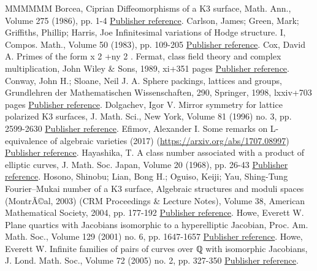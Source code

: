 \documentclass[11pt]{article}
\theoremstyle{definition}
\numberwithin{equation}{section}
\numberwithin{figure}{section}
\numberwithin{table}{section}
\begin{document}
\begin{thebibliography}{MMMMMM}
 Borcea, Ciprian Diffeomorphisms of a K3 surface, Math. Ann., Volume 275 (1986), pp. 1-4 \href{https://ahl.centre-mersenne.org/item/AHL_2018__1__227_0/#Borcea}{Publisher reference}.
 Carlson, James; Green, Mark; Griffiths, Phillip; Harris, Joe Infinitesimal variations of Hodge structure. I, Compos. Math., Volume 50 (1983), pp. 109-205 \href{https://ahl.centre-mersenne.org/item/AHL_2018__1__227_0/#CGGH}{Publisher reference}.
 Cox, David A. Primes of the form x 2 +ny 2 . Fermat, class field theory and complex multiplication, John Wiley \& Sons, 1989, xi+351 pages \href{https://ahl.centre-mersenne.org/item/AHL_2018__1__227_0/#Cox}{Publisher reference}.
 Conway, John H.; Sloane, Neil J. A. Sphere packings, lattices and groups, Grundlehren der Mathematischen Wissenschaften, 290, Springer, 1998, lxxiv+703 pages \href{https://ahl.centre-mersenne.org/item/AHL_2018__1__227_0/#Conway}{Publisher reference}.
 Dolgachev, Igor V. Mirror symmetry for lattice polarized K3 surfaces, J. Math. Sci., New York, Volume 81 (1996) no. 3, pp. 2599-2630 \href{https://ahl.centre-mersenne.org/item/AHL_2018__1__227_0/#Dolg}{Publisher reference}.
 Efimov, Alexander I. Some remarks on L-equivalence of algebraic varieties (2017) (\url{https://arxiv.org/abs/1707.08997}) \href{https://ahl.centre-mersenne.org/item/AHL_2018__1__227_0/#Ef}{Publisher reference}.
 Hayashika, T. A class number associated with a product of elliptic curves, J. Math. Soc. Japan, Volume 20 (1968), pp. 26-43 \href{https://ahl.centre-mersenne.org/item/AHL_2018__1__227_0/#Hay}{Publisher reference}.
 Hosono, Shinobu; Lian, Bong H.; Oguiso, Keiji; Yau, Shing-Tung Fourier–Mukai number of a K3 surface, Algebraic structures and moduli spaces (MontrÃ©al, 2003) (CRM Proceedings \& Lecture Notes), Volume 38, American Mathematical Society, 2004, pp. 177-192 \href{https://ahl.centre-mersenne.org/item/AHL_2018__1__227_0/#Hosono}{Publisher reference}.
 Howe, Everett W. Plane quartics with Jacobians isomorphic to a hyperelliptic Jacobian, Proc. Am. Math. Soc., Volume 129 (2001) no. 6, pp. 1647-1657 \href{https://ahl.centre-mersenne.org/item/AHL_2018__1__227_0/#Howe1}{Publisher reference}.
 Howe, Everett W. Infinite families of pairs of curves over ℚ with isomorphic Jacobians, J. Lond. Math. Soc., Volume 72 (2005) no. 2, pp. 327-350 \href{https://ahl.centre-mersenne.org/item/AHL_2018__1__227_0/#Howe2}{Publisher reference}.

\end{thebibliography}
\end{document}
